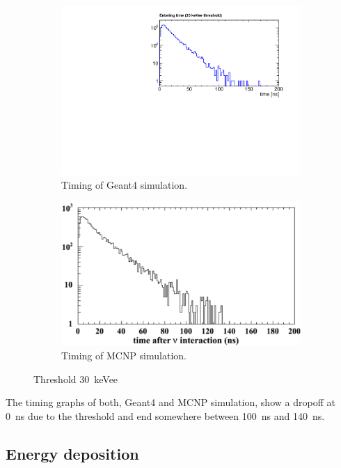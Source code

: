\documentclass[12pt]{article}
\begin{document}
 \begin{figure}[H]
 	\begin{subfigure}[t]{0.49\textwidth}
 	     \includegraphics[trim = 0cm 0cm 0cm 1.15cm, clip, width=\textwidth]{pics/timing.pdf}
 		 \caption{Timing of Geant4 simulation.}
 	\end{subfigure}
 	\begin{subfigure}[t]{0.43\textwidth}
 	    \includegraphics[width=\textwidth]{pics/timing_MCNP.pdf}
 		\caption{Timing of MCNP simulation.}
 	\end{subfigure}
 	\caption{Threshold \SI{30}{keVee}}
 	\label{fig:timing30}
 \end{figure}

The timing graphs of both, Geant4 and MCNP simulation, show a dropoff at \SI{0}{ns} due to the threshold and end somewhere between \SI{100}{ns} and \SI{140}{ns}.  

\subsection{Energy deposition}
\end{document}
